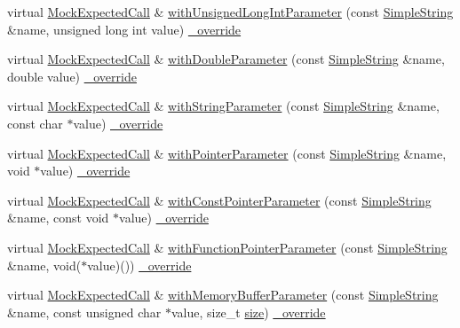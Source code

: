\begin{DoxyCompactItemize}
\item 
virtual \hyperlink{class_mock_expected_call}{Mock\+Expected\+Call} \& \hyperlink{class_mock_checked_expected_call_a7da86441ae351a1a81b1093176fe75cd}{with\+Unsigned\+Long\+Int\+Parameter} (const \hyperlink{class_simple_string}{Simple\+String} \&name, unsigned long int value) \hyperlink{_cpp_u_test_config_8h_a049bea15dd750e15869863c94c1efc3b}{\+\_\+override}
\item 
virtual \hyperlink{class_mock_expected_call}{Mock\+Expected\+Call} \& \hyperlink{class_mock_checked_expected_call_a5be4704cfa6d286196a59e90c4a8eee9}{with\+Double\+Parameter} (const \hyperlink{class_simple_string}{Simple\+String} \&name, double value) \hyperlink{_cpp_u_test_config_8h_a049bea15dd750e15869863c94c1efc3b}{\+\_\+override}
\item 
virtual \hyperlink{class_mock_expected_call}{Mock\+Expected\+Call} \& \hyperlink{class_mock_checked_expected_call_abf23d0df1cd0401698a2642e3552f064}{with\+String\+Parameter} (const \hyperlink{class_simple_string}{Simple\+String} \&name, const char $\ast$value) \hyperlink{_cpp_u_test_config_8h_a049bea15dd750e15869863c94c1efc3b}{\+\_\+override}
\item 
virtual \hyperlink{class_mock_expected_call}{Mock\+Expected\+Call} \& \hyperlink{class_mock_checked_expected_call_a39c1335f3e364291df78953e324cf3ab}{with\+Pointer\+Parameter} (const \hyperlink{class_simple_string}{Simple\+String} \&name, void $\ast$value) \hyperlink{_cpp_u_test_config_8h_a049bea15dd750e15869863c94c1efc3b}{\+\_\+override}
\item 
virtual \hyperlink{class_mock_expected_call}{Mock\+Expected\+Call} \& \hyperlink{class_mock_checked_expected_call_a44bd05d79bd9a6782cf39e897eb6db1e}{with\+Const\+Pointer\+Parameter} (const \hyperlink{class_simple_string}{Simple\+String} \&name, const void $\ast$value) \hyperlink{_cpp_u_test_config_8h_a049bea15dd750e15869863c94c1efc3b}{\+\_\+override}
\item 
virtual \hyperlink{class_mock_expected_call}{Mock\+Expected\+Call} \& \hyperlink{class_mock_checked_expected_call_abecba955304747178e8c6c52a49f4785}{with\+Function\+Pointer\+Parameter} (const \hyperlink{class_simple_string}{Simple\+String} \&name, void($\ast$value)()) \hyperlink{_cpp_u_test_config_8h_a049bea15dd750e15869863c94c1efc3b}{\+\_\+override}
\item 
virtual \hyperlink{class_mock_expected_call}{Mock\+Expected\+Call} \& \hyperlink{class_mock_checked_expected_call_a54587b94a8325e2fca1a721888f398fc}{with\+Memory\+Buffer\+Parameter} (const \hyperlink{class_simple_string}{Simple\+String} \&name, const unsigned char $\ast$value, size\+\_\+t \hyperlink{gst__avb__playbin_8c_a439227feff9d7f55384e8780cfc2eb82}{size}) \hyperlink{_cpp_u_test_config_8h_a049bea15dd750e15869863c94c1efc3b}{\+\_\+override}

\end{DoxyCompactItemize}
